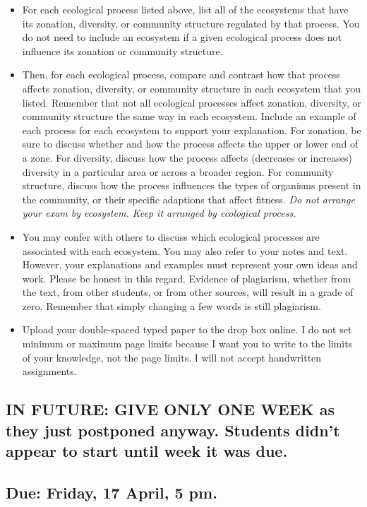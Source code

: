\documentclass[11pt, addpoints]{exam}
\begin{document}
\begin{itemize}
\item
  For each ecological process listed above, list all of the ecosystems
  that have its zonation, diversity, or community structure regulated by that process. You do
  not need to include an ecosystem if a given ecological process does
  not influence its zonation or community structure.
\item
  Then, for each ecological process, compare and contrast how that
  process affects zonation, diversity, or community structure in each ecosystem that you listed.
  Remember that not all ecological processes affect zonation, diversity, or community structure
  the same way in each ecosystem. Include an example of each process for each ecosystem to
  support your explanation. For zonation, be sure to discuss whether and how the process 
  affects the upper or lower end of a zone. For diversity, discuss how the process affects 
  (decreases or increases) diversity in a particular area or across a broader region. For 
  community structure, discuss how the process influences the types of organisms present 
  in the community, or their specific adaptions that affect fitness. \emph{Do not arrange your exam by ecosystem. Keep it arranged by ecological process.}
\item
  You may confer with others to discuss which ecological processes are
  associated with each ecosystem. You may also refer to your notes and text.
  However, your explanations and examples must represent your own ideas
  and work. Please be honest in this regard. Evidence of plagiarism,
  whether from the text, from other students, or from other sources, will result in a grade
  of zero. Remember that simply changing a few words is still
  plagiarism.
\item
  Upload your double-spaced typed paper to the drop box online. I do not set minimum or maximum
  page limits because I want you to write to the limits of your
  knowledge, not the page limits. I will not accept handwritten assignments.
\end{itemize}

\subsection{IN FUTURE: GIVE ONLY ONE WEEK as they just postponed anyway. Students didn't appear to start until week it was due.}

\subsection*{Due: Friday, 17 April, 5 pm.}
\end{document}
